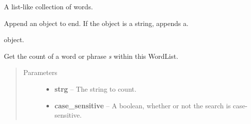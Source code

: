 \documentclass[letterpaper,10pt,english]{sphinxmanual}
\begin{document}
\begin{fulllineitems}
\label{api_reference:textblob_de.blob.WordList}
A list-like collection of words.

\begin{fulllineitems}
\label{api_reference:textblob_de.blob.WordList.append}
Append an object to end. If the object is a string, appends a.

{\hyperref[api_reference:textblob_de.blob.Word]{}} object.

\end{fulllineitems}


\begin{fulllineitems}
\label{api_reference:textblob_de.blob.WordList.clear}
\end{fulllineitems}


\begin{fulllineitems}
\label{api_reference:textblob_de.blob.WordList.copy}
\end{fulllineitems}


\begin{fulllineitems}
\label{api_reference:textblob_de.blob.WordList.count}
Get the count of a word or phrase \emph{s} within this WordList.
\begin{quote}\begin{description}
\item[{Parameters}] \leavevmode\begin{itemize}
\item {} 
\textbf{strg} -- The string to count.

\item {} 
\textbf{case\_sensitive} -- A boolean, whether or not the search is case-sensitive.


\end{itemize}
\end{description}
\end{quote}
\end{fulllineitems}
\end{fulllineitems}
\end{document}
